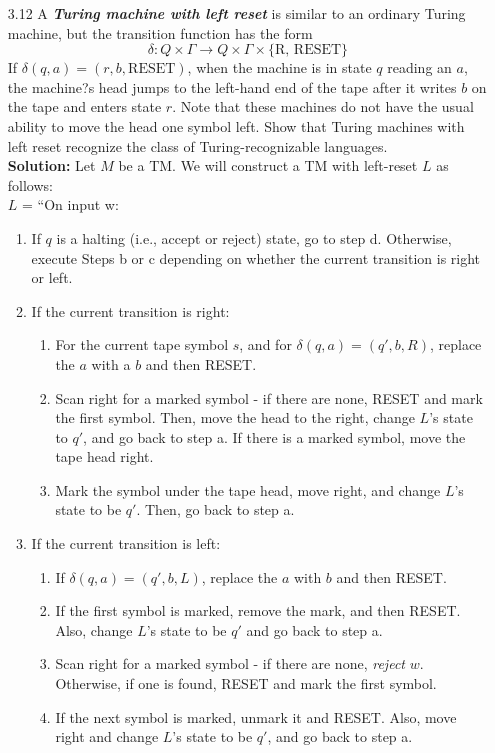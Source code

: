\begin{enumerate}
\item[3.12]A \textbf{\emph{Turing machine with left reset}} is similar to an ordinary Turing machine, but the transition function has the form
\[
\delta \colon Q \times \Gamma \rightarrow Q \times \Gamma \times \{\text{R, RESET}\}
\]
If $\delta(q, a) = (r, b, \text{RESET})$, when the machine is in state $q$ reading an $a$, the machine?s head jumps to the left-hand end of the tape after it writes $b$ on the tape and enters state $r$. Note that these machines do not have the usual ability to move the head one symbol left. Show that Turing machines with left reset recognize the class of Turing-recognizable languages.
\\
\textbf{Solution:} Let $M$ be a TM. We will construct a TM with left-reset $L$ as follows: \\
$L$ = ``On input w:
\begin{enumerate}
\item If $q$ is a halting (i.e., accept or reject) state, go to step d. Otherwise, execute Steps b or c depending on whether the current transition is right or left.
\item If the current transition is right:
\begin{enumerate}
\item For the current tape symbol $s$, and for $\delta(q, a) = (q', b, R)$, replace the $a$ with a $b$ and then RESET.
\item Scan right for a marked symbol - if there are none, RESET and mark the first symbol. Then, move the head to the right, change $L$'s state to $q'$, and go back to step a. If there is a marked symbol, move the tape head right.
\item Mark the symbol under the tape head, move right, and change $L$'s state to be $q'$. Then, go back to step a. 
\end{enumerate}
\item If the current transition is left:
\begin{enumerate}
\item If $\delta(q, a) = (q', b, L)$, replace the $a$ with $b$ and then RESET.
\item If the first symbol is marked, remove the mark, and then RESET. Also, change $L$'s state to be $q'$ and go back to step a. 
\item Scan right for a marked symbol - if there are none, \emph{reject} $w$. Otherwise, if one is found, RESET and mark the first symbol.
\item If the next symbol is marked, unmark it and RESET. Also, move right and change $L$'s state to be $q'$, and go back to step a.

\end{enumerate}
\end{enumerate}
\end{enumerate}
